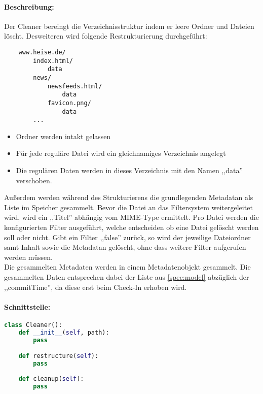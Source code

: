 \paragraph{Beschreibung:}
\label{par:beschreibung_}
Der Cleaner bereingt die Verzeichnisstruktur indem er leere Ordner und Dateien löscht.
Desweiteren wird folgende Restrukturierung durchgeführt:
\begin{verbatim}
    www.heise.de/ 
        index.html/
            data
        news/
            newsfeeds.html/
                data
            favicon.png/
                data
        ...
\end{verbatim}


\begin{itemize}
    \item Ordner werden intakt gelassen
    \item Für jede reguläre Datei wird ein gleichnamiges Verzeichnis angelegt
    \item Die regulären Daten werden in dieses Verzeichnis mit den Namen ,,data'' verschoben.
\end{itemize}

Außerdem werden während des Strukturierens die grundlegenden Metadatan als Liste im Speicher gesammelt.
Bevor die Datei an das Filtersystem weitergeleitet wird, wird ein ,,Titel'' abhängig vom MIME-Type ermittelt.
Pro Datei werden die konfigurierten Filter ausgeführt, welche entscheiden ob eine Datei gelöscht werden soll oder nicht.
Gibt ein Filter ,,false'' zurück, so wird der jeweilige Dateiordner samt Inhalt sowie die Metadatan gelöscht,
ohne dass weitere Filter aufgerufen werden müssen.
\\
Die gesammelten Metadaten werden in einem Metadatenobjekt gesammelt. Die gesammelten Daten entsprechen dabei 
der Liste aus \ref{spec:model} abzüglich der ,,commitTime'', da diese erst beim Check-In erhoben wird.

\paragraph{Schnittstelle:} 
\label{par:schnittstelle_}
\begin{lstlisting}[language=python]
class Cleaner():
    def __init__(self, path):
        pass

    def restructure(self): 
        pass
  
    def cleanup(self):
        pass
\end{lstlisting}



